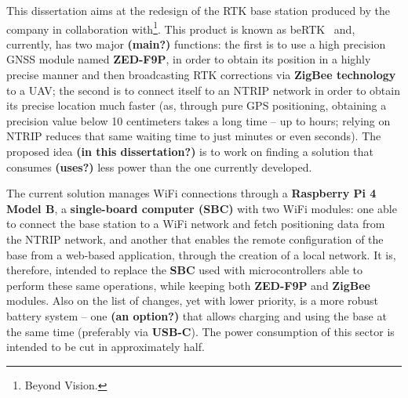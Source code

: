 This dissertation aims at the redesign of the RTK base station produced by the company in collaboration with\footnote{Beyond Vision.}. This product is known as beRTK\textsuperscript{\textregistered}~\cite{beRTK_2022} and, currently, has two major \textbf{(main?)} functions: the first is to use a high precision GNSS module named \textbf{ZED-F9P}, in order to obtain its position in a highly precise manner and then broadcasting RTK corrections via \textbf{ZigBee technology} to a UAV; %
the second is to connect itself to an NTRIP network in order to obtain its precise location much faster (as, through pure GPS positioning, obtaining a precision value below 10 centimeters takes a long time -- up to hours; relying on NTRIP reduces that same waiting time to just minutes or even seconds).
The proposed idea \textbf{(in this dissertation?)} is to work on finding a solution that consumes \textbf{(uses?)} less power than the one currently developed.

The current solution manages WiFi connections through a \textbf{Raspberry Pi 4 Model B}, a \textbf{single-board computer (SBC)} with two WiFi modules:
one able to connect the base station to a WiFi network and fetch positioning data from the NTRIP network, and another that enables the remote configuration of the base from a web-based application, through the creation of a local network.
It is, therefore, intended to replace the \textbf{SBC} used with microcontrollers able to perform these same operations, while keeping both \textbf{ZED-F9P} and \textbf{ZigBee} modules.
Also on the list of changes, yet with lower priority, is a more robust battery system -- one \textbf{(an option?)} that allows charging and using the base at the same time (preferably via \textbf{USB-C}). The power consumption of this sector is intended to be cut in approximately half.
